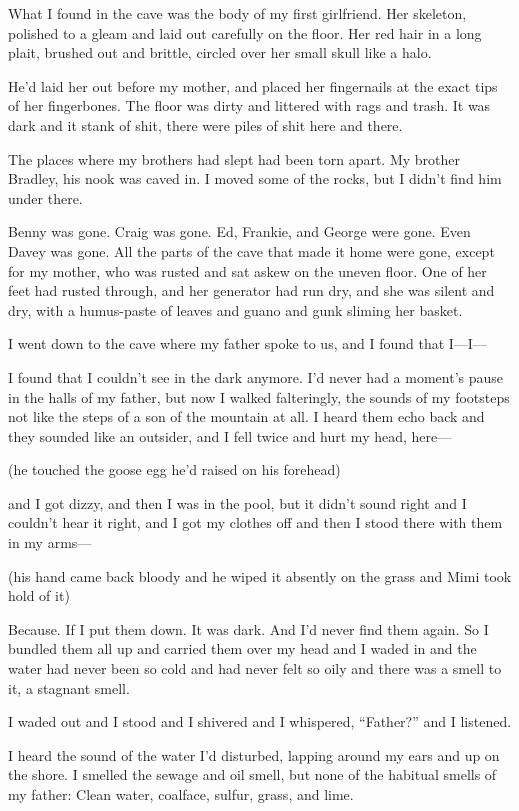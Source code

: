 What I found in the cave was the body of my first girlfriend.  Her
skeleton, polished to a gleam and laid out carefully on the floor. 
Her red hair in a long plait, brushed out and brittle, circled over
her small skull like a halo.

He'd laid her out before my mother, and placed her fingernails at the
exact tips of her fingerbones.  The floor was dirty and littered with
rags and trash.  It was dark and it stank of shit, there were piles of
shit here and there.

The places where my brothers had slept had been torn apart.  My
brother Bradley, his nook was caved in.  I moved some of the rocks,
but I didn't find him under there.

Benny was gone.  Craig was gone.  Ed, Frankie, and George were gone. 
Even Davey was gone.  All the parts of the cave that made it home were
gone, except for my mother, who was rusted and sat askew on the uneven
floor.  One of her feet had rusted through, and her generator had run
dry, and she was silent and dry, with a humus-paste of leaves and
guano and gunk sliming her basket.

I went down to the cave where my father spoke to us, and I found that
I---I---

I found that I couldn't see in the dark anymore.  I'd never had a
moment's pause in the halls of my father, but now I walked
falteringly, the sounds of my footsteps not like the steps of a son of
the mountain at all.  I heard them echo back and they sounded like an
outsider, and I fell twice and hurt my head, here---

(he touched the goose egg he'd raised on his forehead)

and I got dizzy, and then I was in the pool, but it didn't sound right
and I couldn't hear it right, and I got my clothes off and then I
stood there with them in my arms---

(his hand came back bloody and he wiped it absently on the grass and
Mimi took hold of it)

Because.  If I put them down.  It was dark.  And I'd never find them
again.  So I bundled them all up and carried them over my head and I
waded in and the water had never been so cold and had never felt so
oily and there was a smell to it, a stagnant smell.

I waded out and I stood and I shivered and I whispered, ``Father?''
and I listened.

I heard the sound of the water I'd disturbed, lapping around my ears
and up on the shore.  I smelled the sewage and oil smell, but none of
the habitual smells of my father:  Clean water, coalface, sulfur,
grass, and lime.


